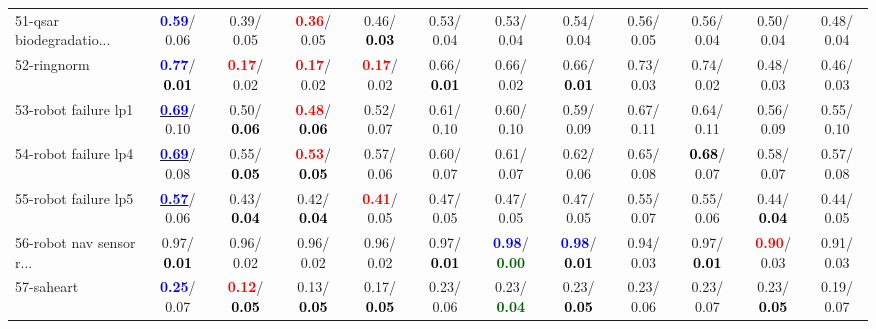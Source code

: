\begin{table}[h]
\begin{center}
{\begin{tabular}{lc|c|c|c|c|c|c|c|c|c|c}
51-qsar biodegradatio... & \textcolor{blue}{\textbf{  0.59}}/  0.06 &   0.39/  0.05 & \textcolor{red}{\textbf{  0.36}}/  0.05 &   0.46/\textcolor{black}{\textbf{  0.03}} &   0.53/  0.04 &   0.53/  0.04 &   0.54/  0.04 &   0.56/  0.05 &   0.56/  0.04 &   0.50/  0.04 &   0.48/  0.04 \\
52-ringnorm & \textcolor{blue}{\textbf{  0.77}}/\textcolor{black}{\textbf{  0.01}} & \textcolor{red}{\textbf{  0.17}}/  0.02 & \textcolor{red}{\textbf{  0.17}}/  0.02 & \textcolor{red}{\textbf{  0.17}}/  0.02 &   0.66/\textcolor{black}{\textbf{  0.01}} &   0.66/  0.02 &   0.66/\textcolor{black}{\textbf{  0.01}} &   0.73/  0.03 &   0.74/  0.02 &   0.48/  0.03 &   0.46/  0.03 \\
53-robot failure lp1 & \underline{\textcolor{blue}{\textbf{  0.69}}}/  0.10 &   0.50/\textcolor{black}{\textbf{  0.06}} & \textcolor{red}{\textbf{  0.48}}/\textcolor{black}{\textbf{  0.06}} &   0.52/  0.07 &   0.61/  0.10 &   0.60/  0.10 &   0.59/  0.09 &   0.67/  0.11 &   0.64/  0.11 &   0.56/  0.09 &   0.55/  0.10 \\ \hline
54-robot failure lp4 & \underline{\textcolor{blue}{\textbf{  0.69}}}/  0.08 &   0.55/\textcolor{black}{\textbf{  0.05}} & \textcolor{red}{\textbf{  0.53}}/\textcolor{black}{\textbf{  0.05}} &   0.57/  0.06 &   0.60/  0.07 &   0.61/  0.07 &   0.62/  0.06 &   0.65/  0.08 & \textcolor{black}{\textbf{  0.68}}/  0.07 &   0.58/  0.07 &   0.57/  0.08 \\
55-robot failure lp5 & \underline{\textcolor{blue}{\textbf{  0.57}}}/  0.06 &   0.43/\textcolor{black}{\textbf{  0.04}} &   0.42/\textcolor{black}{\textbf{  0.04}} & \textcolor{red}{\textbf{  0.41}}/  0.05 &   0.47/  0.05 &   0.47/  0.05 &   0.47/  0.05 &   0.55/  0.07 &   0.55/  0.06 &   0.44/\textcolor{black}{\textbf{  0.04}} &   0.44/  0.05 \\
56-robot nav sensor r... &   0.97/\textcolor{black}{\textbf{  0.01}} &   0.96/  0.02 &   0.96/  0.02 &   0.96/  0.02 &   0.97/\textcolor{black}{\textbf{  0.01}} & \textcolor{blue}{\textbf{  0.98}}/\textcolor{darkgreen}{\textbf{  0.00}} & \textcolor{blue}{\textbf{  0.98}}/\textcolor{black}{\textbf{  0.01}} &   0.94/  0.03 &   0.97/\textcolor{black}{\textbf{  0.01}} & \textcolor{red}{\textbf{  0.90}}/  0.03 &   0.91/  0.03 \\
57-saheart & \textcolor{blue}{\textbf{  0.25}}/  0.07 & \textcolor{red}{\textbf{  0.12}}/\textcolor{black}{\textbf{  0.05}} &   0.13/\textcolor{black}{\textbf{  0.05}} &   0.17/\textcolor{black}{\textbf{  0.05}} &   0.23/  0.06 &   0.23/\textcolor{darkgreen}{\textbf{  0.04}} &   0.23/\textcolor{black}{\textbf{  0.05}} &   0.23/  0.06 &   0.23/  0.07 &   0.23/\textcolor{black}{\textbf{  0.05}} &   0.19/  0.07 \\

\end{tabular}}
\end{center}
\end{table}

